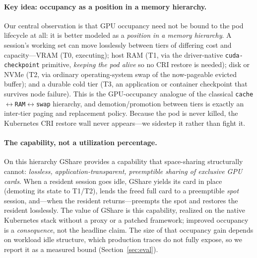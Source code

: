 \documentclass[preprint,12pt]{elsarticle}
\begin{document}
\paragraph{Key idea: occupancy as a position in a memory hierarchy.}
Our central observation is that GPU occupancy need not be bound to the pod lifecycle at all: it is better
modeled as a \emph{position in a memory hierarchy}. A session's working set can move losslessly between
tiers of differing cost and capacity---VRAM (T0, executing); host RAM (T1, via the driver-native
\texttt{cuda-checkpoint} primitive, \emph{keeping the pod alive} so no CRI restore is needed); disk or NVMe
(T2, via ordinary operating-system swap of the now-pageable evicted buffer); and a durable cold tier (T3,
an application or container checkpoint that survives node failure). This is the GPU-occupancy analogue of
the classical \texttt{cache}$\leftrightarrow$\texttt{RAM}$\leftrightarrow$\texttt{swap} hierarchy, and
demotion/promotion between tiers is exactly an inter-tier paging and replacement policy. Because the pod is
never killed, the Kubernetes CRI restore wall never appears---we sidestep it rather than fight it.

\paragraph{The capability, not a utilization percentage.}
On this hierarchy GShare provides a capability that space-sharing structurally cannot: \emph{lossless,
application-transparent, preemptible sharing of exclusive GPU cards}. When a resident session goes idle,
GShare yields its card in place (demoting its state to T1/T2), lends the freed full card to a preemptible
\emph{spot} session, and---when the resident returns---preempts the spot and restores the resident
losslessly. The value of GShare is this capability, realized on the native Kubernetes stack without a
proxy or a patched framework; improved occupancy is a \emph{consequence}, not the headline claim. The size
of that occupancy gain depends on workload idle structure, which production traces do not fully expose, so
we report it as a measured bound (Section~\ref{sec:eval}).
\end{document}
